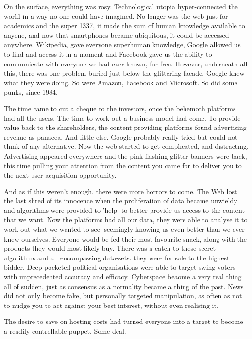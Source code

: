 On the surface, everything was rosy. Technological utopia hyper-connected the world in a way no-one could have imagined. No longer was the web just for academics and the super 1337, it made the sum of human knowledge available to anyone, and now that smartphones became ubiquitous, it could be accessed anywhere. Wikipedia, gave everyone superhuman knowledge, Google allowed us to find and access it in a moment and Facebook gave us the ability to communicate with everyone we had ever known, for free. However, underneath all this, there was one problem buried just below the glittering facade. Google knew what they were doing. So were Amazon, Facebook and Microsoft. So did some punks, since 1984.

The time came to cut a cheque to the investors, once the behemoth platforms had all the users. The time to work out a business model had come. To provide value back to the shareholders, the content providing platforms found advertising revenue as panacea. And little else. Google probably really tried but could not think of any alternative. Now the web started to get complicated, and distracting. Advertising appeared everywhere and the pink flashing glitter banners were back, this time pulling your attention from the content you came for to deliver you to the next user acquisition opportunity.

And as if this weren't enough, there were more horrors to come. The Web lost the last shred of its innocence when the proliferation of data became unwieldy and algorithms were provided to 'help' to better provide us access to the content that we want. Now the platforms had all our data, they were able to analyse it to work out what we wanted to see, seemingly knowing us even better than we ever knew ourselves. Everyone would be fed their most favourite snack, along with the products they would most likely buy. There was a catch to these secret algorithms and all encompassing data-sets: they were for sale to the highest bidder. Deep-pocketed political organisations were able to target swing voters with unprecedented accuracy and efficacy. Cyberspace beaome a very real thing all of sudden, just as consensus as a normality became a thing of the past. News did not only become fake, but personally targeted manipulation, as often as not to nudge you to act against your best interest, without even realising it.

The desire to save on hosting costs had turned everyone into a target to become a readily controllable puppet. Some deal.

